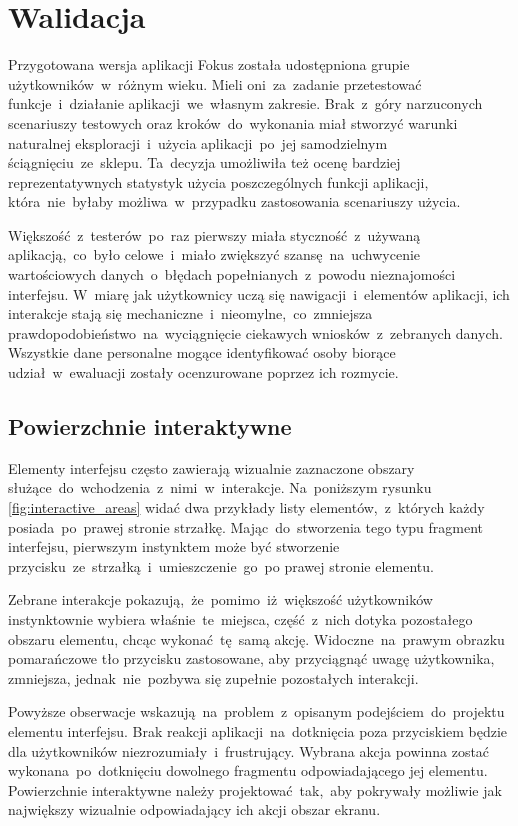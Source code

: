 \section{Walidacja}
Przygotowana wersja aplikacji Fokus została udostępniona grupie użytkowników~w~różnym wieku. Mieli oni~za~zadanie przetestować funkcje~i~działanie aplikacji~we~własnym zakresie. Brak~z~góry narzuconych scenariuszy testowych oraz kroków~do~wykonania miał stworzyć warunki naturalnej eksploracji~i~użycia aplikacji~po~jej samodzielnym ściągnięciu~ze~sklepu. Ta~decyzja umożliwiła też ocenę bardziej reprezentatywnych statystyk użycia poszczególnych funkcji aplikacji, która~nie~byłaby możliwa~w~przypadku zastosowania scenariuszy użycia. 

Większość~z~testerów~po~raz pierwszy miała styczność~z~używaną aplikacją,~co~było celowe~i~miało zwiększyć szansę~na~uchwycenie wartościowych danych~o~błędach popełnianych~z~powodu nieznajomości interfejsu. W~miarę jak użytkownicy uczą się nawigacji~i~elementów aplikacji, ich interakcje stają się mechaniczne~i~nieomylne,~co~zmniejsza prawdopodobieństwo~na~wyciągnięcie ciekawych wniosków~z~zebranych danych. Wszystkie dane personalne mogące identyfikować osoby biorące udział~w~ewaluacji zostały ocenzurowane poprzez ich rozmycie.

\subsection{Powierzchnie interaktywne}
Elementy interfejsu często zawierają wizualnie zaznaczone obszary służące~do~wchodzenia~z~nimi~w~interakcje. Na~poniższym rysunku \ref{fig:interactive_areas} widać dwa przykłady listy elementów,~z~których każdy posiada~po~prawej stronie strzałkę. Mając~do~stworzenia tego typu fragment interfejsu, pierwszym instynktem może być stworzenie przycisku~ze~strzałką~i~umieszczenie~go~po prawej stronie elementu.

Zebrane interakcje pokazują,~że~pomimo~iż~większość użytkowników instynktownie wybiera właśnie~te~miejsca, część~z~nich dotyka pozostałego obszaru elementu, chcąc wykonać~tę~samą akcję. Widoczne~na~prawym obrazku pomarańczowe tło przycisku zastosowane, aby przyciągnąć uwagę użytkownika, zmniejsza, jednak~nie~pozbywa się zupełnie pozostałych interakcji. 

Powyższe obserwacje wskazują~na~problem~z~opisanym podejściem~do~projektu elementu interfejsu. Brak reakcji aplikacji~na~dotknięcia poza przyciskiem będzie dla użytkowników niezrozumiały~i~frustrujący. Wybrana akcja powinna zostać wykonana~po~dotknięciu dowolnego fragmentu odpowiadającego jej elementu. Powierzchnie interaktywne należy projektować~tak,~aby pokrywały możliwie jak największy wizualnie odpowiadający ich akcji obszar ekranu.

